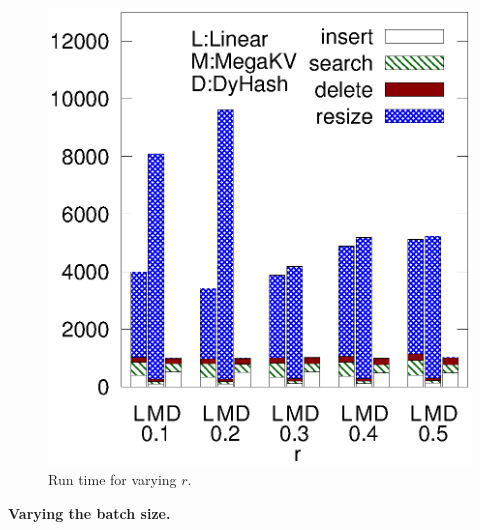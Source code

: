 \begin{figure}[h]
\begin{minipage}{0.18\linewidth}
		\centerline{\dsali}
	\end{minipage}
	\hfill
	\begin{minipage}{0.18\linewidth}\centering
		\includegraphics[width=\linewidth]{pic/dynamic/random/diff_r.eps}
		\centerline{\dsrandom}
	\end{minipage}
	\caption{Run time for varying $r$.}
	\label{fig:vary-r-time}
\end{figure}

\vspace{1mm}\noindent\textbf{Varying the batch size.}

